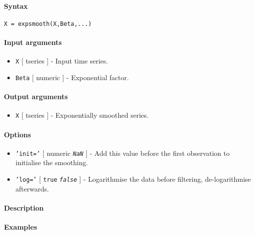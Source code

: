


	\paragraph{Syntax}

\begin{verbatim}
X = expsmooth(X,Beta,...)
\end{verbatim}

\paragraph{Input arguments}

\begin{itemize}
\item
  \texttt{X} {[} tseries {]} - Input time series.
\item
  \texttt{Beta} {[} numeric {]} - Exponential factor.
\end{itemize}

\paragraph{Output arguments}

\begin{itemize}
\itemsep1pt\parskip0pt
\item
  \texttt{X} {[} tseries {]} - Exponentially smoothed series.
\end{itemize}

\paragraph{Options}

\begin{itemize}
\item
  \texttt{'init='} {[} numeric \textbar{} \emph{\texttt{NaN}} {]} - Add
  this value before the first observation to initialise the smoothing.
\item
  \texttt{'log='} {[} \texttt{true} \textbar{} \emph{\texttt{false}} {]}
  - Logarithmise the data before filtering, de-logarithmise afterwards.
\end{itemize}

\paragraph{Description}

\paragraph{Examples}


